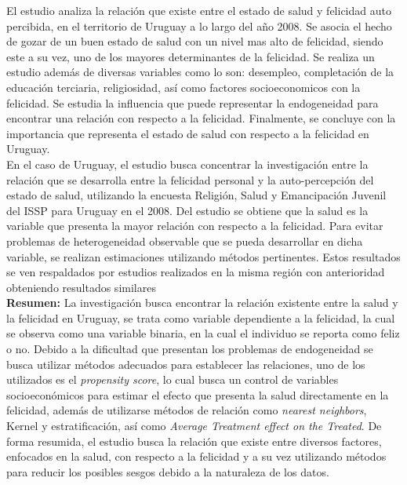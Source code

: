 El estudio analiza la relación que existe entre el estado de salud y felicidad auto percibida, en el territorio de Uruguay a lo largo del año 2008. Se asocia el hecho de gozar de un buen estado de salud con un nivel mas alto de felicidad, siendo este a su vez, uno de los mayores determinantes de la felicidad. Se realiza un estudio además de diversas variables como lo son: desempleo, completación de la educación terciaria, religiosidad, así como factores socioeconomicos con la felicidad. Se estudia la influencia que puede representar la endogeneidad para encontrar una relación con respecto a la felicidad. Finalmente, se concluye con la importancia que representa el estado de salud con respecto a la felicidad en Uruguay. \\

En el caso de Uruguay, el estudio busca concentrar la investigación entre la relación que se desarrolla entre la felicidad personal y la auto-percepción del estado de salud, utilizando la encuesta Religión, Salud y Emancipación Juvenil del ISSP para Uruguay en el 2008. Del estudio se obtiene que la salud es la variable que presenta la mayor relación con respecto a la felicidad. Para evitar problemas de heterogeneidad observable que se pueda desarrollar en dicha variable, se realizan estimaciones utilizando métodos pertinentes. Estos resultados se ven respaldados por estudios realizados en la misma región con anterioridad obteniendo resultados similares\\

\textbf{Resumen:} La investigación busca encontrar la relación existente entre la salud y la felicidad en Uruguay, se trata como variable dependiente a la felicidad, la cual se observa como una variable binaria, en la cual el individuo se reporta como feliz o no. Debido a la dificultad que presentan los problemas de endogeneidad se busca utilizar métodos adecuados para establecer las relaciones, uno de los utilizados es el \textit{propensity score}, lo cual busca un control de variables socioeconómicos para estimar el efecto que presenta la salud directamente en la felicidad, además de utilizarse métodos de relación como \textit{nearest neighbors}, Kernel y estratificación, así como \textit{Average Treatment effect on the Treated}. De forma resumida, el estudio busca la relación que existe entre diversos factores, enfocados en la salud, con respecto a la felicidad y a su vez utilizando métodos para reducir los posibles sesgos debido a la naturaleza de los datos.\\

